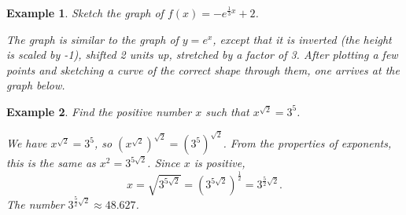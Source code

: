 \documentclass[11pt]{book}               %
\newtheorem{example}{Example}
\begin{document}
\begin{example}
Sketch the graph of $f(x) = -e^{\frac{1}{3}x} + 2$.

\normalfont
The graph is similar to the graph of $y = e^x$, except that it is inverted (the height is scaled by -1), shifted 2 units up, stretched by a factor of 3.  After plotting a few points and sketching a curve of the correct shape through them, one 
arrives at the graph below.

\begin{center}
\end{center}

\end{example}

\bigskip
\begin{example}
Find the positive number $x$  such that $x^{\sqrt{2}} = 3^5$.

\normalfont
We have $x^{\sqrt{2}} = 3^5$, so $\left(x^{\sqrt{2}}\right)^{\sqrt{2}} = \left(3^5\right)^{\sqrt{2}}$.
From the properties of exponents, this is the same as $x^2 = 3^{5 \sqrt{2}}$.
Since $x$ is positive, 
$$x = \sqrt{3^{5 \sqrt{2}}} = \left(3^{5 \sqrt{2}}\right)^{\frac{1}{2}} = 3^{\frac{5}{2}\sqrt{2}}.$$
The number  $ 3^{\frac{5}{2}\sqrt{2}} \approx 48.627$.

\end{example}
\end{document}
